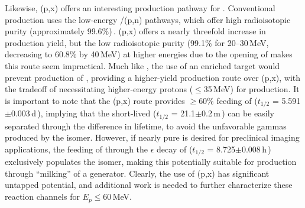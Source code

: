 Likewise, (p,x) offers an interesting production pathway for  .
Conventional production uses the low-energy /(p,n) pathways, which offer high radioisotopic purity (approximately 99.6\%)\,\cite{Graves2015,Wooten2015}.
(p,x) offers a nearly threefold increase in production yield, but the low radioisotopic purity (99.1\% for 20--30\,MeV, decreasing to 60.8\% by 40\,MeV) at higher energies due to the opening of  makes this route seem impractical.
Much like , the use of an enriched  target would prevent production of , providing a higher-yield production route over   (p,x), with the tradeoff of necessitating higher-energy protons ($\leq$35\,MeV) for production.
It is important to note that the (p,x) route provides $\geq$60\% feeding of  ($t_{1/2}$ = 5.591$\pm$0.003\,d\,\cite{Dong2015}), implying that the short-lived   ($t_{1/2}$ = 21.1$\pm$0.2\,m\,\cite{Dong2015}) can be easily separated through the difference in lifetime, to avoid the unfavorable gammas produced by the isomer. 
However, if nearly pure  is desired for preclinical imaging applications, the feeding of  through the $\epsilon$ decay of  ($t_{1/2}$ = 8.725$\pm$0.008\,h\,\cite{Dong2015}) exclusively populates the isomer, making this potentially suitable for production through \enquote{milking} of a  generator.
Clearly, the use of (p,x) has significant untapped potential, and additional work is needed to further characterize these reaction channels for $E_p \leq$60\,MeV.





